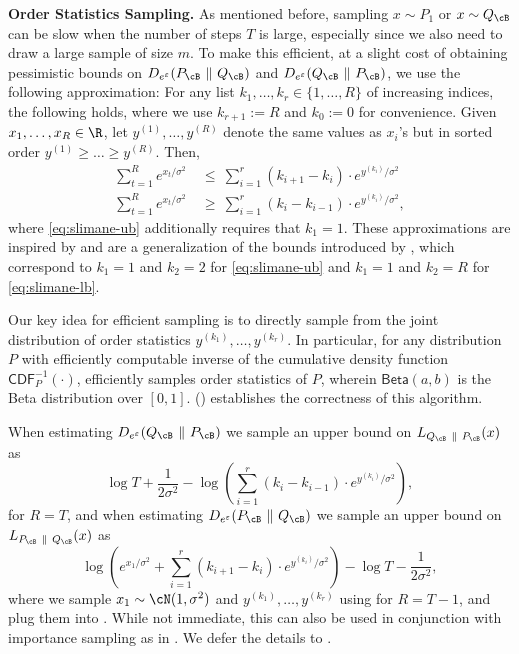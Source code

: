 \documentclass[twoside]{article}
\theoremstyle{definition}
\newcommand{\eps}{\varepsilon}
\newcommand{\prn}[1]{\left ( #1 \right )}
\newcommand{\Deps}{D_{e^{\eps}}}
\newcommand{\PB}{P_{\cB}}
\newcommand{\QB}{Q_{\cB}}
\newcommand{\CDF}{\mathsf{CDF}}
\newcommand{\Beta}{\mathsf{Beta}}
\begin{document}
{\bf Order Statistics Sampling.}
As mentioned before, sampling $x \sim P_1$ or $x \sim \QB$ can be slow when the number of steps $T$ is large, especially since we also need to draw a large sample of size $m$. To make this efficient, at a slight cost of obtaining pessimistic bounds on $\Deps(\PB ~\|~ \QB)$ and $\Deps(\QB ~\|~ \PB)$, we use the following approximation: For any list $k_1, \ldots, k_r \in \{1, \ldots, R\}$  of increasing indices, the following holds, where we use $k_{r+1} := R$ and $k_0 := 0$ for convenience. Given $x_1, \ldots, x_R \in \R$, let $y^{(1)}, \ldots, y^{(R)}$ denote the same values as $x_i$'s but in sorted order $y^{(1)} \ge \dots \ge y^{(R)}$. Then,
\begin{align}
\textstyle\sum_{t=1}^R e^{x_t / \sigma^2}
&\textstyle~\le~ \sum_{i=1}^r (k_{i+1} - k_{i}) \cdot e^{y^{(k_i)} / \sigma^2}\label{eq:slimane-ub}\\
\textstyle\sum_{t=1}^R e^{x_t / \sigma^2}
&\textstyle~\ge~ \sum_{i=1}^r (k_{i} - k_{i-1}) \cdot e^{y^{(k_i)} / \sigma^2},\label{eq:slimane-lb}
\end{align}
where \eqref{eq:slimane-ub} additionally requires that $k_1 = 1$. These approximations are inspired by and are a generalization of the bounds introduced by \cite{slimane01bounds}, which correspond to $k_1 = 1$ and $k_2 = 2$ for \eqref{eq:slimane-ub} and $k_1 = 1$ and $k_2 = R$ for \eqref{eq:slimane-lb}.

Our key idea for efficient sampling is to directly sample from the joint distribution of order statistics $y^{(k_1)}, \ldots, y^{(k_r)}$. In particular, for any distribution $P$ with efficiently computable inverse of the cumulative density function $\CDF_P^{-1}(\cdot)$,  efficiently samples order statistics of $P$, wherein $\Beta(a, b)$ is the Beta distribution over $[0, 1]$.  () establishes the correctness of this algorithm.

When estimating $\Deps(\QB ~\|~ \PB)$ we sample an upper bound on $L_{\QB ~\|~ \PB}(x)$ as
\[\textstyle
\log T + \frac1{2\sigma^2} - \log\prn{\sum_{i=1}^r (k_{i} - k_{i-1}) \cdot e^{y^{(k_i)} / \sigma^2}},
\]
for $R = T$, and when estimating $\Deps(\PB ~\|~ \QB)$ we sample an upper bound on $L_{\PB ~\|~ \QB}(x)$ as
\[\textstyle
\log\prn{e^{x_1 / \sigma^2} + \sum_{i=1}^r (k_{i+1} - k_{i}) \cdot e^{y^{(k_i)} / \sigma^2}} - \log T - \frac1{2\sigma^2},
\]
where we sample $x_1 \sim \cN(1, \sigma^2)$ and $y^{(k_1)}, \ldots, y^{(k_r)}$ using  for $R = T-1$, and plug them into . While not immediate, this can also be used in conjunction with importance sampling as in . 
We defer the details to .
\end{document}
